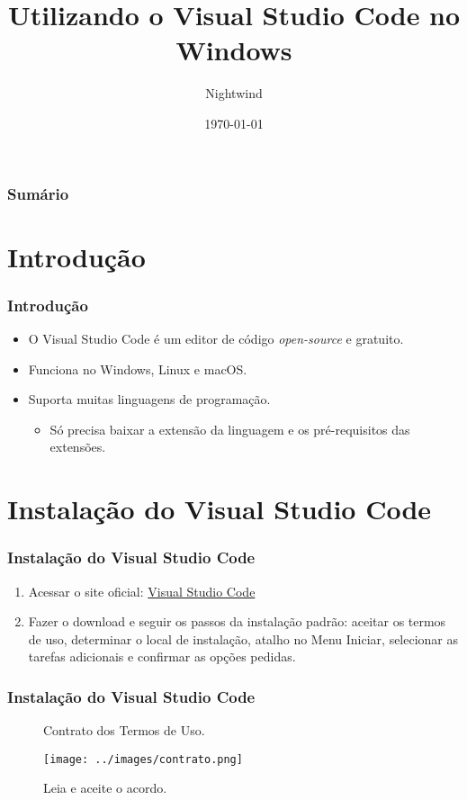 \documentclass{beamer}
\title{Utilizando o Visual Studio Code no Windows}
\author{Nightwind}
\institute[CTISM]{Colégio Técnico Industrial de Santa Maria}
\date{\today}
\begin{document}
\frame{\titlepage}

\begin{frame}
    \frametitle{Sumário}
    \tableofcontents
\end{frame}

\section{Introdução}
\begin{frame}
    \frametitle{Introdução}

    \begin{itemize}
        \item O Visual Studio Code é um editor de código \textit{open-source} e gratuito.
        \item Funciona no Windows, Linux e macOS.
        \item Suporta muitas linguagens de programação.
        \begin{itemize}
            \item Só precisa baixar a extensão da linguagem e os pré-requisitos das extensões.
        \end{itemize}
    \end{itemize}

\end{frame}

\section{Instalação do Visual Studio Code}

\begin{frame}
    \frametitle{Instalação do Visual Studio Code}
    \begin{enumerate}
        \item Acessar o site oficial: \href{https://code.visualstudio.com/Download}{Visual Studio Code}
        \item Fazer o download e seguir os passos da instalação padrão: aceitar os termos de uso, determinar o local de instalação, atalho no Menu Iniciar, selecionar as tarefas adicionais e confirmar as opções pedidas.
    \end{enumerate}
\end{frame}

\begin{frame}
    \frametitle{Instalação do Visual Studio Code}
\begin{figure}[h]
    \centering
    \caption{Contrato dos Termos de Uso.}
    \label{fig:contrato}
    \texttt{[image: ../images/contrato.png]}
    \caption*{\footnotesize Leia e aceite o acordo.}
\end{figure}
\end{frame}
\end{document}
